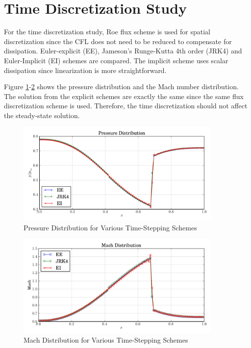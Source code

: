 \documentclass[letterpaper,12pt,]{article}
\begin{document}
\section{Time Discretization Study}

For the time discretization study, Roe flux scheme is used for spatial discretization since the CFL does not need to be reduced to compensate for dissipation.
Euler-explicit (EE), Jameson's Runge-Kutta 4th order (JRK4) and Euler-Implicit (EI) schemes are compared.
The implicit scheme uses scalar dissipation since linearization is more straightforward.

Figure \ref{fig:q5p}-\ref{fig:q5m} shows the pressure distribution and the Mach number distribution.
The solution from the explicit schemes are exactly the same since the same flux discretization scheme is used.
Therefore, the time discretization should not affect the steady-state solution.

\begin{figure}[!ht]
    \centering
    \includegraphics[width = 0.9\textwidth]{./figures/q5p.pdf}
    \caption {Pressure Distribution for Various Time-Stepping Schemes}
    \label{fig:q5p}
\end{figure}

\begin{figure}[!ht]
    \centering
    \includegraphics[width = 0.9\textwidth]{./figures/q5m.pdf}
    \caption {Mach Distribution for Various Time-Stepping Schemes}
    \label{fig:q5m}
\end{figure}
\end{document}
